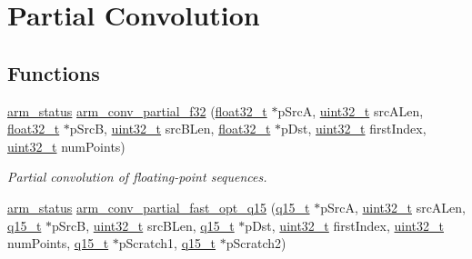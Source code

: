\hypertarget{group___partial_conv}{\section{Partial Convolution}
\label{group___partial_conv}
}
\subsection*{Functions}
\begin{DoxyCompactItemize}
\item 
\hyperlink{arm__math_8h_a5e459c6409dfcd2927bb8a57491d7cf6}{arm\-\_\-status} \hyperlink{group___partial_conv_ga16d10f32072cd79fc5fb6e785df45f5e}{arm\-\_\-conv\-\_\-partial\-\_\-f32} (\hyperlink{arm__math_8h_a4611b605e45ab401f02cab15c5e38715}{float32\-\_\-t} $\ast$p\-Src\-A, \hyperlink{stdint_8h_a435d1572bf3f880d55459d9805097f62}{uint32\-\_\-t} src\-A\-Len, \hyperlink{arm__math_8h_a4611b605e45ab401f02cab15c5e38715}{float32\-\_\-t} $\ast$p\-Src\-B, \hyperlink{stdint_8h_a435d1572bf3f880d55459d9805097f62}{uint32\-\_\-t} src\-B\-Len, \hyperlink{arm__math_8h_a4611b605e45ab401f02cab15c5e38715}{float32\-\_\-t} $\ast$p\-Dst, \hyperlink{stdint_8h_a435d1572bf3f880d55459d9805097f62}{uint32\-\_\-t} first\-Index, \hyperlink{stdint_8h_a435d1572bf3f880d55459d9805097f62}{uint32\-\_\-t} num\-Points)
\begin{DoxyCompactList}\small\item\em Partial convolution of floating-\/point sequences. \end{DoxyCompactList}\item 
\hyperlink{arm__math_8h_a5e459c6409dfcd2927bb8a57491d7cf6}{arm\-\_\-status} \hyperlink{group___partial_conv_ga3de9c4ddcc7886de25b70d875099a8d9}{arm\-\_\-conv\-\_\-partial\-\_\-fast\-\_\-opt\-\_\-q15} (\hyperlink{arm__math_8h_ab5a8fb21a5b3b983d5f54f31614052ea}{q15\-\_\-t} $\ast$p\-Src\-A, \hyperlink{stdint_8h_a435d1572bf3f880d55459d9805097f62}{uint32\-\_\-t} src\-A\-Len, \hyperlink{arm__math_8h_ab5a8fb21a5b3b983d5f54f31614052ea}{q15\-\_\-t} $\ast$p\-Src\-B, \hyperlink{stdint_8h_a435d1572bf3f880d55459d9805097f62}{uint32\-\_\-t} src\-B\-Len, \hyperlink{arm__math_8h_ab5a8fb21a5b3b983d5f54f31614052ea}{q15\-\_\-t} $\ast$p\-Dst, \hyperlink{stdint_8h_a435d1572bf3f880d55459d9805097f62}{uint32\-\_\-t} first\-Index, \hyperlink{stdint_8h_a435d1572bf3f880d55459d9805097f62}{uint32\-\_\-t} num\-Points, \hyperlink{arm__math_8h_ab5a8fb21a5b3b983d5f54f31614052ea}{q15\-\_\-t} $\ast$p\-Scratch1, \hyperlink{arm__math_8h_ab5a8fb21a5b3b983d5f54f31614052ea}{q15\-\_\-t} $\ast$p\-Scratch2)

\end{DoxyCompactItemize}

